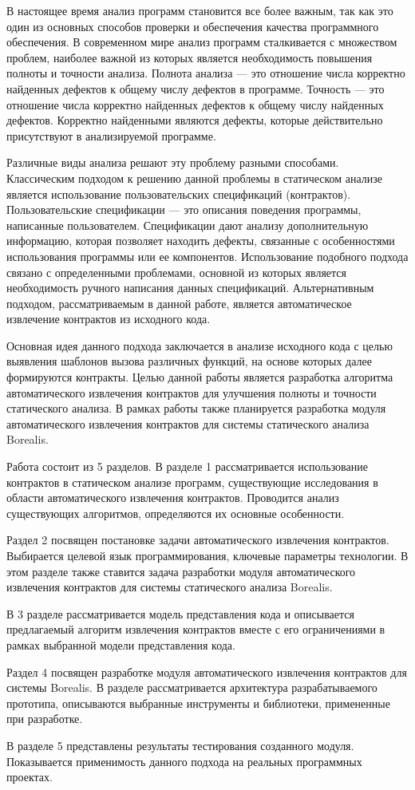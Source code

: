 \intro
В настоящее время анализ программ становится все более важным, так как это один из основных способов проверки и обеспечения качества программного обеспечения. В современном мире анализ программ сталкивается с множеством проблем, наиболее важной из которых является необходимость повышения полноты и точности анализа. Полнота анализа --- это отношение числа корректно найденных дефектов к общему числу дефектов в программе. Точность --- это отношение числа корректно найденных дефектов к общему числу найденных дефектов. Корректно найденными являются дефекты, которые действительно присутствуют в анализируемой программе.

Различные виды анализа решают эту проблему разными способами. Классическим подходом к решению данной проблемы в статическом анализе является использование пользовательских спецификаций (контрактов). Пользовательские спецификации --- это описания поведения программы, написанные пользователем. Спецификации дают анализу дополнительную информацию, которая позволяет находить дефекты, связанные с особенностями использования программы или ее компонентов. Использование подобного подхода связано с определенными проблемами, основной из которых является необходимость ручного написания данных спецификаций. Альтернативным подходом, рассматриваемым в данной работе, является автоматическое извлечение контрактов из исходного кода.

Основная идея данного подхода заключается в анализе исходного кода с целью выявления шаблонов вызова различных функций, на основе которых далее формируются контракты. Целью данной работы является разработка алгоритма автоматического извлечения контрактов для улучшения полноты и точности статического анализа. В рамках работы также планируется разработка модуля автоматического извлечения контрактов для системы статического анализа Borealis\cite{borealis}.

Работа состоит из 5 разделов. В разделе 1 рассматривается использование контрактов в статическом анализе программ, существующие исследования в области автоматического извлечения контрактов. Проводится анализ существующих алгоритмов, определяются их основные особенности.

Раздел 2 посвящен постановке задачи автоматического извлечения контрактов. Выбирается целевой язык программирования, ключевые параметры технологии. В этом разделе также ставится задача разработки модуля автоматического извлечения контрактов для системы статического анализа Borealis.

В 3 разделе рассматривается модель представления кода и описывается предлагаемый алгоритм извлечения контрактов вместе с его ограничениями в рамках выбранной модели представления кода.

Раздел 4 посвящен разработке модуля автоматического извлечения контрактов для системы Borealis. В разделе рассматривается архитектура разрабатываемого прототипа, описываются выбранные инструменты и библиотеки, примененные при разработке.

В разделе 5 представлены результаты тестирования созданного модуля. Показывается применимость данного подхода на реальных программных проектах.
